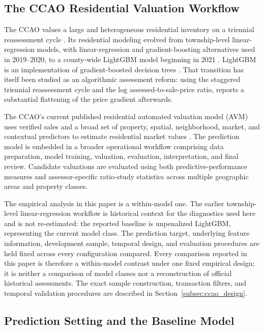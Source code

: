 \documentclass[10pt]{article}
\theoremstyle{definition}
\newcommand{\1}{\mathbf{1}}
\begin{document}
\subsection{The CCAO Residential Valuation Workflow}
\label{subsec:ccao_workflow}

The CCAO values a large and heterogeneous residential inventory on a triennial reassessment cycle \cite{CCAOAssessmentCalendar2026}. Its residential modeling evolved from township-level linear-regression models, with linear-regression and gradient-boosting alternatives used in 2019--2020, to a county-wide LightGBM model beginning in 2021 \cite{CCAOModelResAVM2026}. LightGBM is an implementation of gradient-boosted decision trees \cite{lightgbm}. That transition has itself been studied as an algorithmic assessment reform: using the staggered triennial reassessment cycle and the log assessed-to-sale-price ratio, \textcite{Liu2026} reports a substantial flattening of the price gradient afterwards.

The CCAO's current published residential automated valuation model (AVM) uses verified sales and a broad set of property, spatial, neighborhood, market, and contextual predictors to estimate residential market values \cite{CCAOModelResAVM2026}. The prediction model is embedded in a broader operational workflow comprising data preparation, model training, valuation, evaluation, interpretation, and final review. Candidate valuations are evaluated using both predictive-performance measures and assessor-specific ratio-study statistics across multiple geographic areas and property classes.


The empirical analysis in this paper is a within-model one. The earlier township-level linear-regression workflow is historical context for the diagnostics used here and is not re-estimated: the reported baseline is unpenalized LightGBM, representing the current model class. The prediction target, underlying feature information, development sample, temporal design, and evaluation procedures are held fixed across every configuration compared.
Every comparison reported in this paper is therefore a within-model contrast under one fixed empirical design; it is neither a comparison of model classes nor a reconstruction of official historical assessments. The exact sample construction, transaction filters, and temporal validation procedures are described in Section~\ref{subsec:ccao_design}.


\subsection{Prediction Setting and the Baseline Model}
\label{subsec:baseline_models}
\end{document}
